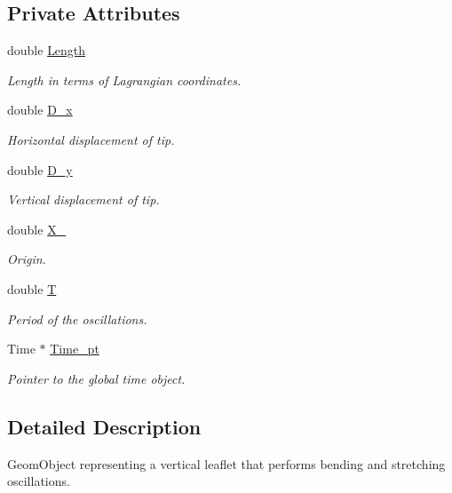 \subsection*{Private Attributes}
\begin{DoxyCompactItemize}
\item 
double \hyperlink{classLeaflet_a64c27b796ceece358d09d137f15bbf20}{Length}
\begin{DoxyCompactList}\small\item\em Length in terms of Lagrangian coordinates. \end{DoxyCompactList}\item 
double \hyperlink{classLeaflet_a473b6f4ef98bfba9e2c6974027ba4f4b}{D\+\_\+x}
\begin{DoxyCompactList}\small\item\em Horizontal displacement of tip. \end{DoxyCompactList}\item 
double \hyperlink{classLeaflet_af9c75c7aeecae4b14f7ba0fb245eb8ee}{D\+\_\+y}
\begin{DoxyCompactList}\small\item\em Vertical displacement of tip. \end{DoxyCompactList}\item 
double \hyperlink{classLeaflet_a29a25366a0cf97ad0dd36172fdfa3d0c}{X\+\_}
\begin{DoxyCompactList}\small\item\em Origin. \end{DoxyCompactList}\item 
double \hyperlink{classLeaflet_a0d78b5fb3ec71009d4a9bcc79f8a85a9}{T}
\begin{DoxyCompactList}\small\item\em Period of the oscillations. \end{DoxyCompactList}\item 
Time $\ast$ \hyperlink{classLeaflet_ac10f13ad45456dc714ab57042861de53}{Time\+\_\+pt}
\begin{DoxyCompactList}\small\item\em Pointer to the global time object. \end{DoxyCompactList}\end{DoxyCompactItemize}


\subsection{Detailed Description}
Geom\+Object representing a vertical leaflet that performs bending and stretching oscillations. 

